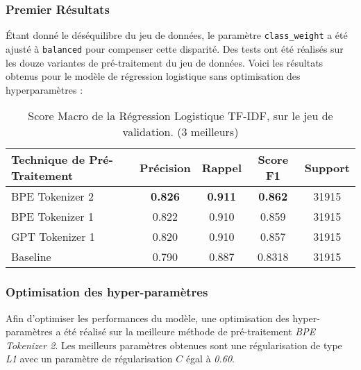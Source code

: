 \subsubsection{Premier Résultats}
Étant donné le déséquilibre du jeu de données, le paramètre \texttt{class\_weight} a été ajusté à \texttt{balanced} pour compenser cette disparité. 
Des tests ont été réalisés sur les douze variantes de pré-traitement du jeu de données.
Voici les résultats obtenus pour le modèle de régression logistique sans optimisation des hyperparamètres :

\begin{table}[ht]
    \centering
    \caption{Score Macro de la Régression Logistique TF-IDF, sur le jeu de validation. (3 meilleurs)}
    \begin{tabular}{lcccc}
    \hline
    \textbf{Technique de Pré-Traitement} & \textbf{Précision} & \textbf{Rappel} & \textbf{Score F1} & \textbf{Support} \\ \hline
    BPE Tokenizer 2                       & \textbf{0.826}         & \textbf{0.911}         & \textbf{0.862}             & 31915            \\
    BPE Tokenizer 1                           & 0.822              & 0.910                   & 0.859             & 31915            \\
    GPT Tokenizer 1                              & 0.820              & 0.910                & 0.857             & 31915            \\ \hline
    Baseline                & 0.790              & 0.887           & 0.8318             & 31915            \\ \hline
    \end{tabular}
    \label{tab:results}
    \end{table}

\subsubsection{Optimisation des hyper-paramètres}
Afin d'optimiser les performances du modèle, une optimisation des hyper-paramètres a été réalisé sur la meilleure méthode de pré-traitement \textit{BPE Tokenizer 2}. 
Les meilleurs paramètres obtenues sont une régularisation de type \textit{L1} avec un paramètre de régularisation $C$ égal à \textit{0.60}.

